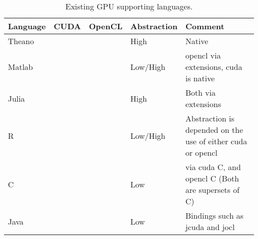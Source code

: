 \begin{table}
	\centering
	\begin{tabular}{|l|c|c|l|l|}
	\hline
	\textbf{Language} & \textbf{CUDA}         & \textbf{OpenCL} & \textbf{Abstraction} & \textbf{Comment}			  		\\ \hline
	Theano   & \cmark           & \cmark            & High      &  Native                                                          \\ \hline
	Matlab   & \cmark           & \cmark            & Low/High        &  \gls{opencl} via extensions, \gls{cuda} is native                                                         \\ \hline
	Julia    & \cmark           & \cmark              & High        &  Both via extensions                                                          \\ \hline
	R        & \cmark           & \cmark            & Low/High    & Abstraction is depended on the use of either \gls{cuda} or \gls{opencl} \\ \hline
	C   & \cmark           & \cmark            & Low         & via \gls{cuda} C, and \gls{opencl} C (Both are supersets of C)                                           \\ \hline
	Java     & \cmark           & \cmark              &   Low          & Bindings such as jcuda and jocl                                            \\ \hline
	\end{tabular}
	\caption{Existing GPU supporting languages. }\label{tbl:sota}
\end{table}
               